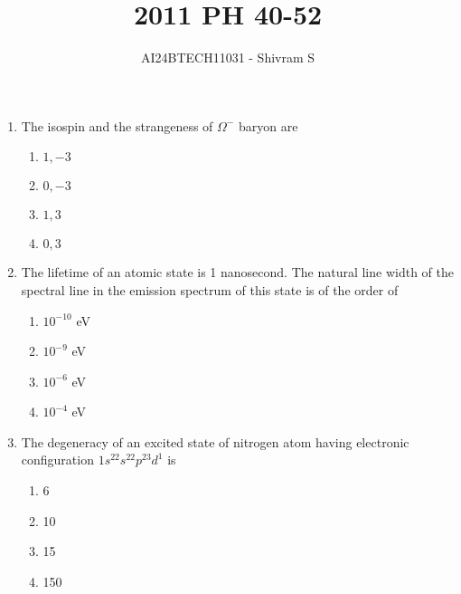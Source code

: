 \documentclass[journal]{IEEEtran}
\begin{document}

\onecolumn

\title{2011 PH 40-52}
\author{AI24BTECH11031 - Shivram S}
\maketitle
\bigskip

\renewcommand{\thefigure}{\theenumi}
\renewcommand{\thetable}{\theenumi}

\begin{enumerate}
    \item The isospin and the strangeness of $\Omega^-$ baryon are
    \begin{multicols}{4}
        \begin{enumerate}
            \item $1,-3$
            \item $0,-3$
            \item $1,3$
            \item $0,3$
        \end{enumerate}
    \end{multicols}
    
    \item The lifetime of an atomic state is 1 nanosecond. The natural line width of the spectral line in the emission spectrum
    of this state is of the order of
    \begin{multicols}{2}
        \begin{enumerate}
            \item $10^{-10}$ eV
            \item $10^{-9}$ eV
            \item $10^{-6}$ eV
            \item $10^{-4}$ eV
        \end{enumerate}
    \end{multicols}
    
    \item The degeneracy of an excited state of nitrogen atom having electronic configuration
    $1s^22s^22p^23d^1$ is
    \begin{multicols}{4}
        \begin{enumerate}
            \item 6
            \item 10
            \item 15
            \item 150
        \end{enumerate}
    \end{multicols}


\end{enumerate}
\end{document}
